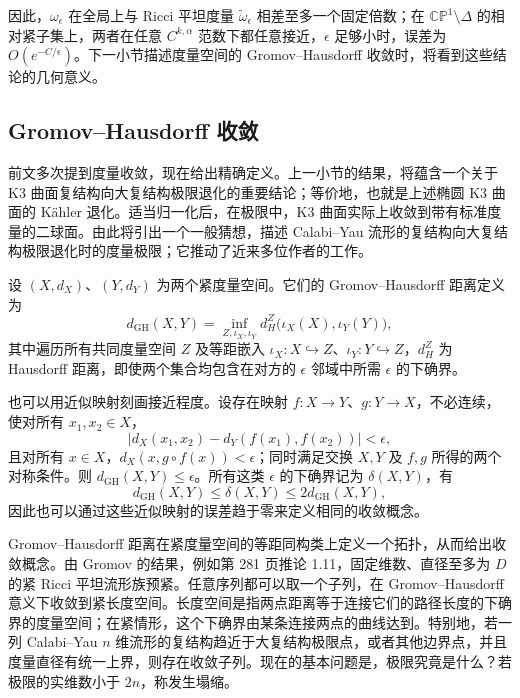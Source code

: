因此，$\omega_\epsilon$ 在全局上与 Ricci 平坦度量 $\widetilde\omega_\epsilon$ 相差至多一个固定倍数；在 $\mathbb{CP}^1\setminus\Delta$ 的相对紧子集上，两者在任意 $C^{k,\alpha}$ 范数下都任意接近，$\epsilon$ 足够小时，误差为 $O(e^{-C/\epsilon})$。下一小节描述度量空间的 Gromov--Hausdorff 收敛时，将看到这些结论的几何意义。

\subsection{Gromov--Hausdorff 收敛}\label{sec:7.3.6}

前文多次提到度量收敛，现在给出精确定义。上一小节的结果，将蕴含一个关于 K3 曲面复结构向大复结构极限退化的重要结论；等价地，也就是上述椭圆 K3 曲面的 Kähler 退化。适当归一化后，在极限中，K3 曲面实际上收敛到带有标准度量的二球面。由此将引出一个一般猜想，描述 Calabi--Yau 流形的复结构向大复结构极限退化时的度量极限；它推动了近来多位作者的工作。

\begin{definition}\label{def:7.30}
设 $(X,d_X)$、$(Y,d_Y)$ 为两个紧度量空间。它们的 Gromov--Hausdorff 距离定义为
\[
d_{\mathrm{GH}}(X,Y)
=\inf_{Z,\iota_X,\iota_Y}
d_H^Z\bigl(\iota_X(X),\iota_Y(Y)\bigr),
\]
其中遍历所有共同度量空间 $Z$ 及等距嵌入 $\iota_X\colon X\hookrightarrow Z$、$\iota_Y\colon Y\hookrightarrow Z$，$d_H^Z$ 为 Hausdorff 距离，即使两个集合均包含在对方的 $\epsilon$ 邻域中所需 $\epsilon$ 的下确界。

也可以用近似映射刻画接近程度。设存在映射 $f\colon X\to Y$、$g\colon Y\to X$，不必连续，使对所有 $x_1,x_2\in X$，
\[
|d_X(x_1,x_2)-d_Y(f(x_1),f(x_2))|<\epsilon,
\]
且对所有 $x\in X$，$d_X(x,g\circ f(x))<\epsilon$；同时满足交换 $X,Y$ 及 $f,g$ 所得的两个对称条件。则 $d_{\mathrm{GH}}(X,Y)\leq\epsilon$。所有这类 $\epsilon$ 的下确界记为 $\delta(X,Y)$，有
\[
d_{\mathrm{GH}}(X,Y)\leq\delta(X,Y)\leq2d_{\mathrm{GH}}(X,Y),
\]
因此也可以通过这些近似映射的误差趋于零来定义相同的收敛概念。
\end{definition}

Gromov--Hausdorff 距离在紧度量空间的等距同构类上定义一个拓扑，从而给出收敛概念。由 Gromov 的结果，例如第 281 页推论 1.11，固定维数、直径至多为 $D$ 的紧 Ricci 平坦流形族预紧。任意序列都可以取一个子列，在 Gromov--Hausdorff 意义下收敛到紧长度空间。长度空间是指两点距离等于连接它们的路径长度的下确界的度量空间；在紧情形，这个下确界由某条连接两点的曲线达到。特别地，若一列 Calabi--Yau $n$ 维流形的复结构趋近于大复结构极限点，或者其他边界点，并且度量直径有统一上界，则存在收敛子列。现在的基本问题是，极限究竟是什么？若极限的实维数小于 $2n$，称发生塌缩。

